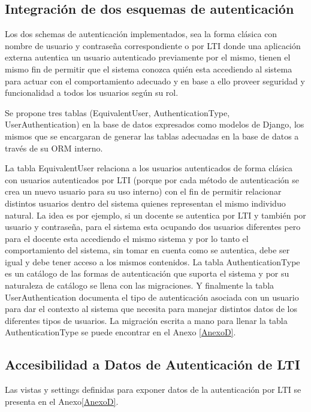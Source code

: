 \subsection{Integración de dos esquemas de autenticación}
Los dos schemas de autenticación implementados, sea la forma clásica con nombre de usuario y contraseña correspondiente o por LTI  donde una aplicación externa autentica un usuario autenticado previamente por el mismo, tienen el mismo fin de permitir que el sistema conozca quién esta accediendo al sistema para actuar con el comportamiento adecuado y en base a ello proveer seguridad y funcionalidad a todos los usuarios según su rol.

Se propone tres tablas (EquivalentUser, AuthenticationType, UserAuthentication) en la base de datos expresados como modelos de Django, los mismos que se encargaran de generar las tablas adecuadas en la base de datos a través de su ORM interno.

La tabla EquivalentUser relaciona a los usuarios autenticados de forma clásica con usuarios autenticados por LTI  (porque por cada método de autenticación se crea un nuevo usuario para su uso interno) con el fin de permitir relacionar distintos usuarios dentro del sistema quienes representan el mismo individuo natural. La idea es por ejemplo, si un docente se autentica por LTI  y también por usuario y contraseña, para el sistema esta ocupando dos usuarios diferentes pero para el docente esta accediendo el mismo sistema y por lo tanto el comportamiento del sistema, sin tomar en cuenta como se autentica, debe ser igual y debe tener acceso a los mismos contenidos. La tabla AuthenticationType es un catálogo de las formas de autenticación que suporta el sistema y por su naturaleza de catálogo se llena con las migraciones. Y finalmente la tabla UserAuthentication documenta el tipo de autenticación asociada con un usuario para dar el contexto al sistema que necesita para manejar distintos datos de los diferentes tipos de usuarios. La migración escrita a mano para llenar la tabla AuthenticationType se puede encontrar en el Anexo \ref{AnexoD}.

\subsection{Accesibilidad a Datos de Autenticación de LTI}
Las vistas y settings definidas para exponer datos de la autenticación por LTI se presenta en el Anexo\ref{AnexoD}.

